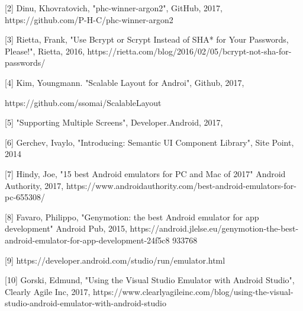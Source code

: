 \documentclass{scrreprt}
\begin{document}
[2] Dinu, Khovratovich, "phc-winner-argon2", GitHub, 2017, 
https://github.com/P-H-C/phc-winner-argon2 \\ \relax

[3] Rietta, Frank, "Use Bcrypt or Scrypt Instead of SHA* for Your Passwords, Please!", Rietta,
2016, https://rietta.com/blog/2016/02/05/bcrypt-not-sha-for-passwords/ \\ \relax

[4] Kim, Youngmann. "Scalable Layout for Androi", Github, 2017,    

https://github.com/ssomai/ScalableLayout \\ \relax

[5] "Supporting Multiple Screens", Developer.Android, 2017, \\ \relax 

[6] Gerchev, Ivaylo, "Introducing: Semantic UI Component Library", Site Point, 2014 \\ \relax

[7] Hindy, Joe, "15 best Android emulators for PC and Mac of 2017" Android Authority, 2017, 
https://www.androidauthority.com/best-android-emulators-for-pc-655308/ \\ \relax

[8] Favaro, Philippo, "Genymotion: the best Android emulator for app development" Android Pub, 
2015, https://android.jlelse.eu/genymotion-the-best-android-emulator-for-app-development-24f5c8
933768 \\ \relax

[9] https://developer.android.com/studio/run/emulator.html \\ \relax

[10] Gorski, Edmund, "Using the Visual Studio Emulator with Android Studio", Clearly Agile Inc,
2017, https://www.clearlyagileinc.com/blog/using-the-visual-studio-android-emulator-with-android-studio \\ \relax
\end{document}
